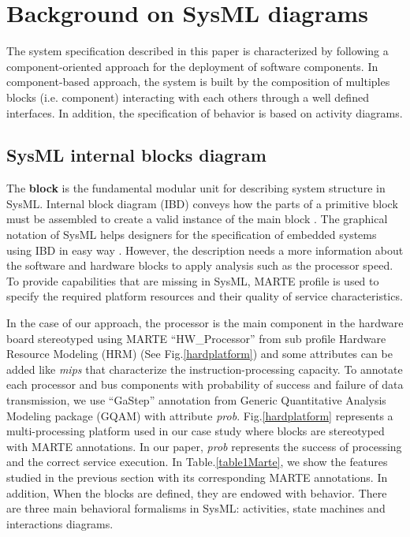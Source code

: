 \documentclass[3p,times,procedia,authoryear,round]{elsarticle}
\begin{document}
\section{Background on SysML diagrams }
\label{section3}

The system specification described in this paper is characterized by following a component-oriented approach \citep{Szyperski2002} for the deployment of software components. In component-based approach, the system is built by the composition of multiples blocks (i.e. component) interacting with each others through a well defined interfaces. In addition, the specification of behavior is based on activity diagrams.

 
\subsection{SysML internal blocks  diagram }
The \textbf{block} \citep{Friedenthal} is the fundamental modular unit for describing system structure in SysML. Internal block diagram (IBD) conveys how the parts of a primitive block must be assembled to create a valid instance of the main block \citep{Delligatti2013}.  The graphical notation of SysML helps designers for the specification of embedded systems using IBD in easy way \citep{Nejati2012}. However, the description needs a more information about the software and hardware blocks to apply analysis such as the processor speed. To provide capabilities that are missing in SysML, MARTE profile is used to specify the required platform resources and their quality of service characteristics.

In the case of our approach, the processor is the main component in the hardware board stereotyped using MARTE ``HW_Processor'' from sub profile Hardware Resource Modeling (HRM) (See Fig.\ref{hardplatform}) and some attributes can be added like \emph{mips} that characterize the instruction-processing capacity. To annotate each processor and bus components with probability of success and failure of  data transmission, we use ``GaStep'' annotation from Generic Quantitative Analysis Modeling package (GQAM) with attribute \emph{prob}. Fig.\ref{hardplatform} represents a multi-processing platform used in our case study where blocks are stereotyped with MARTE annotations.  In our paper, \emph{prob} represents the success of processing and the correct service execution. In Table.\ref{table1Marte}, we show the features studied in the previous section with its corresponding MARTE annotations. In addition, When the blocks are defined, they are endowed with behavior. There are three main behavioral formalisms in SysML: activities, state machines and interactions diagrams. 
\end{document}
